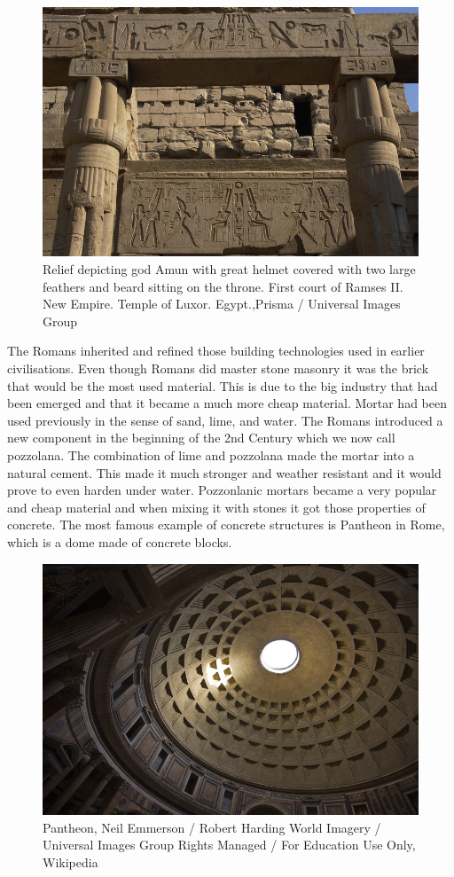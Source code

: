 \begin{figure}[H]
\centering
\includegraphics[width=0.9\linewidth ]{figure/Introduction/EgyptArchitecture.jpg}
\caption{Relief depicting god Amun with great helmet covered with two large feathers and beard sitting on the throne. First court of Ramses II. New Empire. Temple of Luxor. Egypt.,Prisma / Universal Images Group
}
\end{figure}

The Romans inherited and refined those building technologies used in earlier civilisations. Even though Romans did master stone masonry it was the brick that would be the most used material. This is due to the big industry that had been emerged and that it became a much more cheap material. Mortar had been used previously in the sense of sand, lime, and water. The Romans introduced a new component in the beginning of the 2nd Century which we now call pozzolana. The combination of lime and pozzolana made the mortar into a natural cement. This made it much stronger and weather resistant and it would prove to even harden under water. Pozzonlanic mortars became a very popular and cheap material and when mixing it with stones it got those properties of concrete\cite{ref:buildConstrBrit}. The most famous example of concrete structures is Pantheon in Rome, which is a dome made of concrete blocks.
\begin{figure}[H]
\centering
\includegraphics[width=0.9\linewidth ]{figure/Introduction/PantheonInt.jpg}
\caption{Pantheon, Neil Emmerson / Robert Harding World Imagery / Universal Images Group
Rights Managed / For Education Use Only, Wikipedia}
\end{figure}


